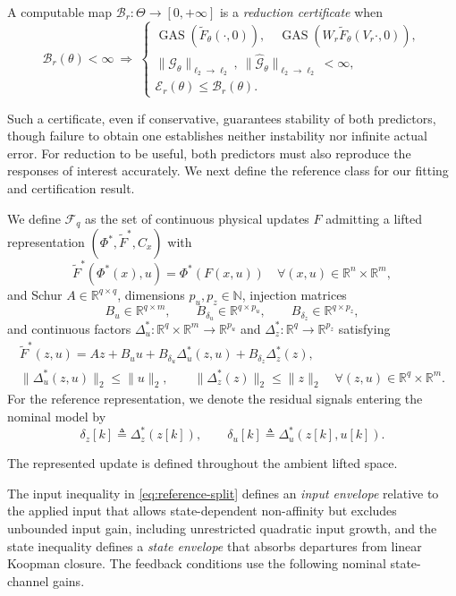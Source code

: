 \documentclass{l4dc2027}
\newcommand{\R}{\mathbb R}
\newcommand{\eqdef}{\triangleq}
\begin{document}
\begin{definition}\label{def:certificate}
A computable map \mbox{$\mathcal B_r:\Theta\to[0,+\infty]$} is a \emph{reduction certificate} when
\begin{equation}\label{eq:certificate-property}
 \mathcal B_r(\theta)<\infty\ \Longrightarrow\
 \begin{cases}
 \operatorname{GAS}(\widetilde F_\theta(\cdot,0)),\quad
 \operatorname{GAS}(W_r\widetilde F_\theta(V_r\cdot,0)),\\
 \|\mathcal G_\theta\|_{\ell_2\to\ell_2},\
 \|\widehat{\mathcal G}_\theta\|_{\ell_2\to\ell_2}<\infty,\\
 \mathcal E_r(\theta)\le\mathcal B_r(\theta).
 \end{cases}
\end{equation}
\end{definition}
Such a certificate, even if conservative, guarantees stability of both predictors, though failure to obtain one establishes neither instability nor infinite actual error.
For reduction to be useful, both predictors must also reproduce the responses of interest accurately.
We next define the reference class for our fitting and certification result.
\begin{definition}[Gain-bounded reference class]\label{def:reference}
We define \mbox{$\mathcal F_q$} as the set of continuous physical updates \mbox{$F$} admitting a lifted representation \mbox{$(\Phi^*,\widetilde F^*,C_x)$} with
\begin{equation}\label{eq:reference-identity}
 \widetilde F^*(\Phi^*(x),u)=\Phi^*(F(x,u))\quad\forall(x,u)\in\R^n\times\R^m,
\end{equation}
and Schur \mbox{$A\in\R^{q\times q}$}, dimensions \mbox{$p_u,p_z\in\mathbb N$}, injection matrices
\[
 B_u\in\R^{q\times m},\qquad
 B_{\delta_u}\in\R^{q\times p_u},\qquad
 B_{\delta_z}\in\R^{q\times p_z},
\]
and continuous factors \mbox{$\Delta_u^*:\R^q\times\R^m\to\R^{p_u}$} and \mbox{$\Delta_z^*:\R^q\to\R^{p_z}$} satisfying
\begin{equation}\label{eq:reference-split}
 \begin{gathered}
 \widetilde F^*(z,u)=Az+B_uu+B_{\delta_u}\Delta_u^*(z,u)+B_{\delta_z}\Delta_z^*(z),\\
 \|\Delta_u^*(z,u)\|_2\le\|u\|_2,\qquad
 \|\Delta_z^*(z)\|_2\le\|z\|_2\quad\forall(z,u)\in\R^q\times\R^m.
 \end{gathered}
\end{equation}
For the reference representation, we denote the residual signals entering the nominal model by
\[
 \delta_z[k]\eqdef\Delta_z^*(z[k]),
 \qquad
 \delta_u[k]\eqdef\Delta_u^*(z[k],u[k]).
\]

The represented update is defined throughout the ambient lifted space.
\end{definition}
The input inequality in \eqref{eq:reference-split} defines an \emph{input envelope} relative to the applied input that allows state-dependent non-affinity but excludes unbounded input gain, including unrestricted quadratic input growth, and the state inequality defines a \emph{state envelope} that absorbs departures from linear Koopman closure.
The feedback conditions use the following nominal state-channel gains.
\end{document}
